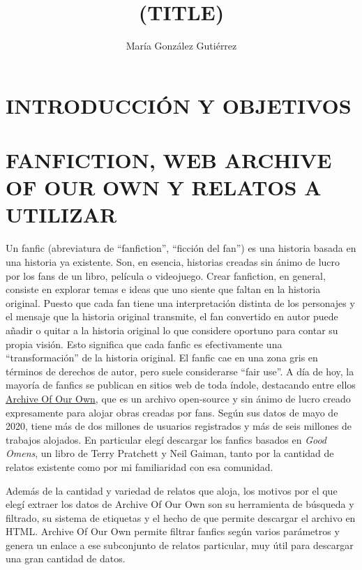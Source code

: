 \documentclass{pre-tfg}
\title{(TITLE)}
\author{María González Gutiérrez}
\begin{document}
\maketitle
\tableofcontents

\newpage


\section{INTRODUCCIÓN Y OBJETIVOS}


\section{FANFICTION, WEB ARCHIVE OF OUR OWN Y RELATOS A UTILIZAR}
Un fanfic (abreviatura de “fanfiction”, “ficción del fan”) es una historia basada en una historia ya existente. Son, en esencia, historias creadas sin ánimo de lucro por los fans de un libro, película o videojuego. 
Crear fanfiction, en general, consiste en explorar temas e ideas que uno siente que faltan en la historia original. Puesto que cada fan tiene una interpretación distinta de los personajes y el mensaje que la historia original transmite, el fan convertido en autor puede añadir o quitar a la historia original lo que considere oportuno para contar su propia visión. Esto significa que cada fanfic es efectivamente una “transformación” de la historia original.
El fanfic cae en una zona gris en términos de derechos de autor, pero suele considerarse “fair use”. A día de hoy, la mayoría de fanfics se publican en sitios web de toda índole, destacando entre ellos \href{archiveofourown.org}{Archive Of Our Own}, que es un archivo open-source y sin ánimo de lucro creado expresamente para alojar obras creadas por fans. Según sus datos de mayo de 2020, tiene más de dos millones de usuarios registrados y más de seis millones de trabajos alojados. En particular elegí descargar los fanfics basados en \textit{Good Omens}, un libro de Terry Pratchett y Neil Gaiman, tanto por la cantidad de relatos existente como por mi familiaridad con esa comunidad.

Además de la cantidad y variedad de relatos que aloja, los motivos por el que elegí extraer los datos de Archive Of Our Own son su herramienta de búsqueda y filtrado, su sistema de etiquetas y el hecho de que permite descargar el archivo en HTML. Archive Of Our Own permite filtrar fanfics según varios parámetros y genera un enlace a ese subconjunto de relatos particular, muy útil para descargar una gran cantidad de datos.
\end{document}

